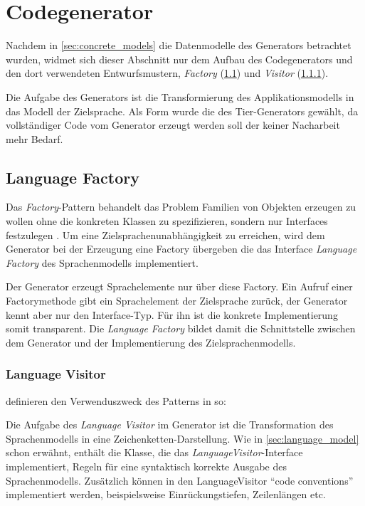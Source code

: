 \section{Codegenerator}
\label{sec:codegenerator}

Nachdem in \cref{sec:concrete_models} die Datenmodelle des Generators betrachtet wurden, widmet sich dieser Abschnitt nur dem Aufbau des Codegenerators und den dort verwendeten Entwurfsmustern, \emph{Factory} (\cref{sec:language_factory}) und \emph{Visitor} (\cref{sec:language_visitor}).

Die Aufgabe des Generators ist die Transformierung des Applikationsmodells in das Modell der Zielsprache. Als Form wurde die des Tier-Generators gewählt, da vollständiger Code vom Generator erzeugt werden soll der keiner Nacharbeit mehr Bedarf. 

\subsection{Language Factory}
\label{sec:language_factory}

Das \emph{Factory}-Pattern behandelt das Problem Familien von Objekten erzeugen zu wollen ohne die konkreten Klassen zu spezifizieren, sondern nur Interfaces festzulegen \cite[][S. 26]{patternsKompakt}.
Um eine Zielsprachenunabhängigkeit zu erreichen, wird dem Generator bei der Erzeugung eine Factory übergeben die das Interface \emph{Language Factory} des Sprachenmodells implementiert. 

Der Generator erzeugt Sprachelemente nur über diese Factory. Ein Aufruf einer Factorymethode gibt ein Sprachelement der Zielsprache zurück, der Generator kennt aber nur den Interface-Typ. Für ihn ist die konkrete Implementierung somit transparent. 
Die \emph{Language Factory} bildet damit die Schnittstelle zwischen dem Generator und der Implementierung des Zielsprachenmodells.

\subsubsection{Language Visitor}
\label{sec:language_visitor}

\citeauthor{patternsKompakt} definieren den Verwenduszweck des Patterns in \cite[][S. 60]{patternsKompakt} so: 

Die Aufgabe des \emph{Language Visitor} im Generator ist die Transformation des Sprachenmodells in eine Zeichenketten-Darstellung. Wie in \cref{sec:language_model} schon erwähnt, enthält die Klasse, die das \emph{LanguageVisitor}-Interface implementiert, Regeln für eine syntaktisch korrekte Ausgabe des Sprachenmodells. Zusätzlich können in den LanguageVisitor \enquote{code conventions} implementiert werden, beispielsweise Einrückungstiefen, Zeilenlängen etc.

